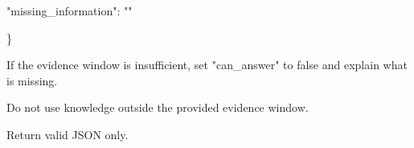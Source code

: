 \begin{tcolorbox}[colback=white, colframe=my-green, coltitle=black, parskip=5mm, title=\textbf{Document Read}, halign=flush left, enhanced, breakable, skin first=enhanced, skin middle=enhanced, skin last=enhanced]
\begin{scriptsize}
  "missing\_information": ""\par
\}\par
\mbox{}\par
If the evidence window is insufficient, set "can\_answer" to false and explain what is missing.\par
Do not use knowledge outside the provided evidence window.\par
Return valid JSON only.\par
\end{scriptsize}
\end{tcolorbox}
